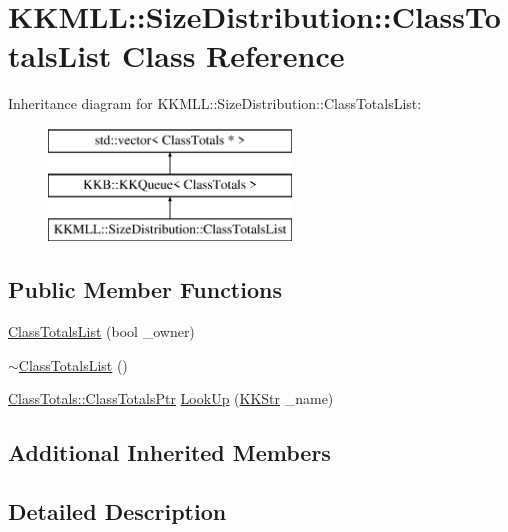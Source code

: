 \hypertarget{class_size_distribution_1_1_class_totals_list}{}\section{K\+K\+M\+LL\+:\+:Size\+Distribution\+:\+:Class\+Totals\+List Class Reference}
\label{class_size_distribution_1_1_class_totals_list}
Inheritance diagram for K\+K\+M\+LL\+:\+:Size\+Distribution\+:\+:Class\+Totals\+List\+:\begin{figure}[H]
\begin{center}
\leavevmode
\includegraphics[height=3.000000cm]{class_size_distribution_1_1_class_totals_list}
\end{center}
\end{figure}
\subsection*{Public Member Functions}
\begin{DoxyCompactItemize}
\item 
\hyperlink{class_size_distribution_1_1_class_totals_list_aac1192a1e3d1666cbf5ef6a3ce2567af}{Class\+Totals\+List} (bool \+\_\+owner)
\item 
\hyperlink{class_size_distribution_1_1_class_totals_list_a4e798e1c6a32aa77151b3c12c9d33ce3}{$\sim$\+Class\+Totals\+List} ()
\item 
\hyperlink{class_size_distribution_1_1_class_totals_a2686de1099514e243ffe29eef7c0ed03}{Class\+Totals\+::\+Class\+Totals\+Ptr} \hyperlink{class_size_distribution_1_1_class_totals_list_a02a7ba9ba316f307794c4a5183fe9fd6}{Look\+Up} (\hyperlink{class_k_k_b_1_1_k_k_str}{K\+K\+Str} \+\_\+name)
\end{DoxyCompactItemize}
\subsection*{Additional Inherited Members}


\subsection{Detailed Description}


